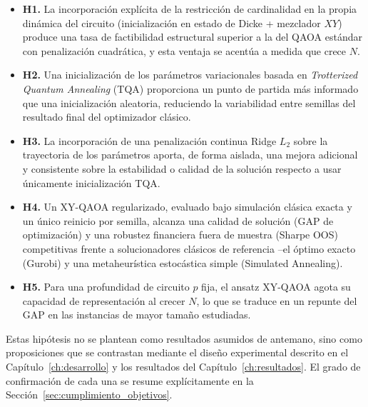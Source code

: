 \begin{itemize}
    \item \textbf{H1.} La incorporación explícita de la restricción de cardinalidad en la
    propia dinámica del circuito (inicialización en estado de Dicke + mezclador $XY$)
    produce una tasa de factibilidad estructural superior a la del QAOA estándar con
    penalización cuadrática, y esta ventaja se acentúa a medida que crece $N$.

    \item \textbf{H2.} Una inicialización de los parámetros variacionales basada en
    \textit{Trotterized Quantum Annealing} (TQA) proporciona un punto de partida más
    informado que una inicialización aleatoria, reduciendo la variabilidad entre semillas
    del resultado final del optimizador clásico.

    \item \textbf{H3.} La incorporación de una penalización continua Ridge $L_2$ sobre la
    trayectoria de los parámetros aporta, de forma aislada, una mejora adicional y
    consistente sobre la estabilidad o calidad de la solución respecto a usar únicamente
    inicialización TQA.

    \item \textbf{H4.} Un XY-QAOA regularizado, evaluado bajo simulación clásica exacta y
    un único reinicio por semilla, alcanza una calidad de solución (GAP de optimización) y
    una robustez financiera fuera de muestra (Sharpe OOS) competitivas frente a
    solucionadores clásicos de referencia --el óptimo exacto (Gurobi) y una metaheurística
    estocástica simple (Simulated Annealing).

    \item \textbf{H5.} Para una profundidad de circuito $p$ fija, el ansatz XY-QAOA agota
    su capacidad de representación al crecer $N$, lo que se traduce en un repunte del GAP
    en las instancias de mayor tamaño estudiadas.
\end{itemize}

Estas hipótesis no se plantean como resultados asumidos de antemano, sino como
proposiciones que se contrastan mediante el diseño experimental descrito en el
Capítulo~\ref{ch:desarrollo} y los resultados del Capítulo~\ref{ch:resultados}. El grado
de confirmación de cada una se resume explícitamente en la
Sección~\ref{sec:cumplimiento_objetivos}.

